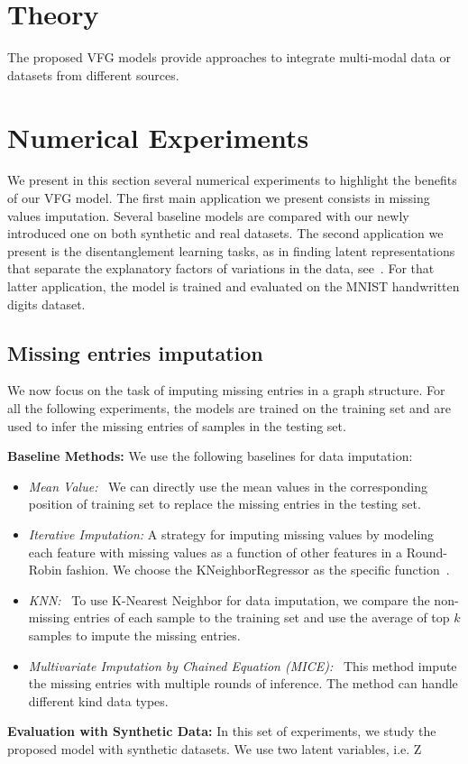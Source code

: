\documentclass{article} %
\newcommand{\belhal}[1]{{\color{red}{\bf\sf [BK: #1]}}}
\begin{document}
\section{Theory}\label{sec:theory}
The proposed VFG models provide approaches to integrate multi-modal data or datasets from different sources. 

\section{Numerical Experiments}\label{sec:numerical}
We present in this section several numerical experiments to highlight the benefits of our VFG model.
The first main application we present consists in missing values imputation. Several baseline models are compared with our newly introduced one on both synthetic and real datasets.
The second application we present is the disentanglement learning tasks, as in finding latent representations that separate the explanatory factors of variations in the data, see~\citet{bengio2013representation}.
For that latter application, the model is trained and evaluated on the MNIST handwritten digits dataset.

\subsection{Missing entries imputation}
We now focus on the task of imputing missing entries in a graph structure.
For all the following experiments, the models are trained on the training set and are used to infer the missing entries of samples in the testing set.

\textbf{Baseline Methods:} We use the following baselines for data imputation:
\begin{itemize}
\item \textit{Mean Value:} \ We can directly use the mean values in the corresponding position of training set to replace the missing entries in the testing set.  
\item \textit{Iterative Imputation:} A strategy for imputing missing values by modeling each feature with missing values as a function of other features in a Round-Robin fashion. 
\belhal{Don't need to cite sklearn here I believe. To confirm.} 
We choose the KNeighborRegressor as the specific function~\citep{scikit-learn}.
\item \textit{KNN:} \  To use K-Nearest Neighbor for data imputation,  we compare the non-missing entries of each sample to the training set and use the  average of top $k$ samples to impute the missing entries. 
\item \textit{Multivariate Imputation by Chained Equation (MICE):} \ This method impute the missing entries with multiple  rounds of inference. The method can handle different kind data types.
\end{itemize}
\textbf{Evaluation with Synthetic Data: }
In this set of experiments, we study the proposed model with synthetic datasets.
We use two latent variables, i.e. Z
\end{document}

